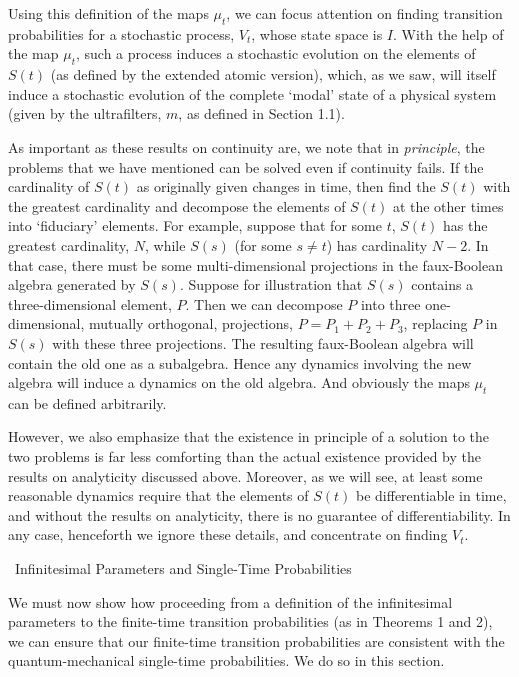 \documentclass[12pt]{article}
\renewcommand{\subsection}[1]{\addtocounter{subsection}{1}
                           \setcounter{subsubsection}{0}
                           \vspace{20pt}
                           \begin{center}
                           \thesubsection \ #1
                           \end{center}
                           \vspace{20pt}}
\begin{document}
Using this definition of the maps $\mu_{t}$, we can focus attention on
finding transition probabilities for a stochastic process, $V_{t}$,
whose state space is $I$.  With the help of the map $\mu_{t}$, such a
process induces a stochastic evolution on the elements of $S(t)$ (as
defined by the extended atomic version), which, as we saw, will itself
induce a stochastic evolution of the complete `modal' state of a
physical system (given by the ultrafilters, $m$, as defined in Section
1.1).

As important as these results on continuity are, we note that in {\it
principle}, the problems that we have mentioned can be solved even if
continuity fails.  If the cardinality of $S(t)$ as originally given
changes in time, then find the $S(t)$ with the greatest cardinality
and decompose the elements of $S(t)$ at the other times into
`fiduciary' elements.  For example, suppose that for some $t$, $S(t)$
has the greatest cardinality, $N$, while $S(s)$ (for some $s \neq t$)
has cardinality $N-2$.  In that case, there must be some
multi-dimensional projections in the faux-Boolean algebra generated by
$S(s)$.  Suppose for illustration that $S(s)$ contains a
three-dimensional element, $P$.  Then we can decompose $P$ into three
one-dimensional, mutually orthogonal, projections, $P = P_{1} + P_{2}
+ P_{3}$, replacing $P$ in $S(s)$ with these three projections.  The
resulting faux-Boolean algebra will contain the old one as a
subalgebra.  Hence any dynamics involving the new algebra will induce
a dynamics on the old algebra.  And obviously the maps $\mu_{t}$ can
be defined arbitrarily.

However, we also emphasize that the existence in principle of a
solution to the two problems is far less comforting than the actual
existence provided by the results on analyticity discussed above.
Moreover, as we will see, at least some reasonable dynamics require
that the elements of $S(t)$ be differentiable in time, and without the
results on analyticity, there is no guarantee of differentiability.
In any case, henceforth we ignore these details, and concentrate on
finding $V_{t}$.


\subsection{Infinitesimal Parameters and Single-Time Probabilities}


We must now show how proceeding from a definition of the infinitesimal 
parameters to the finite-time transition probabilities (as in Theorems 
1 and 2), we can ensure that our finite-time transition probabilities 
are consistent with the quantum-mechanical single-time probabilities.  
We do so in this section.
\end{document}
